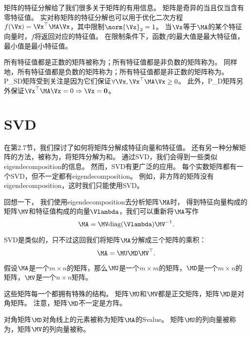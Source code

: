 

矩阵的特征分解给了我们很多关于矩阵的有用信息。
矩阵是奇异的当且仅当含有零特征值。
实对称矩阵的特征分解也可以用于优化二次方程$f(\Vx) = \Vx^\top \MA \Vx$，其中限制$\norm{\Vx}_2 = 1$。
当$\Vx$等于$\MA$的某个特征向量时，$f$将返回对应的特征值。
在限制条件下，函数$f$的最大值是最大特征值，最小值是最小特征值。


所有特征值都是正数的矩阵被称为；所有特征值都是非负数的矩阵称为。
同样地，所有特征值都是负数的矩阵称为；所有特征值都是非正数的矩阵称为。
\gls{P_SD}矩阵受到关注是因为它们保证$\forall \Vx, \Vx^\top \MA \Vx \geq 0$。
此外，\gls{P_D}矩阵另外保证$\Vx^\top \MA \Vx =0 \Rightarrow \Vx = \mathbf{0}$。





\section{\gls{SVD}}
\label{sec:singular_value_decomposition}

在第2.7节，我们探讨了如何将矩阵分解成特征向量和特征值。
还有另一种分解矩阵的方法，被称为，将矩阵分解为和。
通过\gls{SVD}，我们会得到一些类似\gls{eigendecomposition}的信息。
然而，\gls{SVD}有更广泛的应用。
每个实数矩阵都有一个\gls{SVD}，但不一定都有\gls{eigendecomposition}。
例如，非方阵的矩阵没有\gls{eigendecomposition}，这时我们只能使用\gls{SVD}。


回想一下， 我们使用\gls{eigendecomposition}去分析矩阵$\MA$时， 得到特征向量构成的矩阵$\MV$和特征值构成的向量$\Vlambda$，我们可以重新将$\MA$写作
\begin{equation}
    \MA=\MV\text{diag}(\Vlambda)\MV^{-1}.
\end{equation}

\gls{SVD}是类似的，只不过这回我们将矩阵$\MA$分解成三个矩阵的乘积：
\begin{equation}
    \MA=\MU\MD\MV^\top.
\end{equation}


假设$\MA$是一个$m\times n$的矩阵，那么$\MU$是一个$m\times m$的矩阵，$\MD$是一个$m\times n$的矩阵，$\MV$是一个$n\times n$矩阵。



这些矩阵每一个都拥有特殊的结构。
矩阵$\MU$和$\MV$都是正交矩阵，矩阵$\MD$是对角矩阵。
注意，矩阵$\MD$不一定是方阵。


对角矩阵$\MD$对角线上的元素被称为矩阵$\MA$的\gls{Svalue}。
矩阵$\MU$的列向量被称为，矩阵$\MV$的列向量被称。


